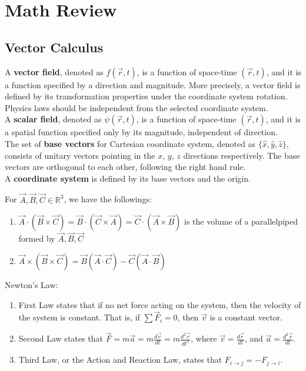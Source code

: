 \documentclass[11pt,oneside]{book}
\theoremstyle{break}
\theoremstyle{break}
\newcommand{\R}{\mathbb{R}}
\begin{document}
\tableofcontents
{}

\newpage
\chapter{Math Review}
\section[Vector Calculus]{\color{red} Vector Calculus\color{black}}
A \textbf{vector field}, denoted as $f(\vec{r},t)$, is a function of space-time $(\vec{r},t)$, and it is a function specified by a direction and magnitude. More precisely, a vector field is defined by its transformation properties under the coordinate system rotation. Physics laws should be independent from the selected coordinate system. \\

A \textbf{scalar field}, denoted as $\psi(\vec{r},t)$, is a function of space-time $(\vec{r},t)$, and it is a spatial function specified only by its magnitude, independent of direction.\\

The set of \textbf{base vectors} for Cartesian coordinate system, denoted as $\{\hat{x},\hat{y}, \hat{z}\}$, consists of unitary vectors pointing in the $x$, $y$, $z$ directions respectively. The base vectors are orthogonal to each other, following the right hand rule.\\

A \textbf{coordinate system} is defined by its base vectors and the origin. 

For $\vec{A},\vec{B},\vec{C} \in \R^3$, we have the followings:
\begin{enumerate}
\item $\vec{A}\cdot (\vec{B}\times \vec{C}) = \vec{B}\cdot (\vec{C}\times \vec{A}) = \vec{C}\cdot (\vec{A}\times \vec{B})$ is the volume of a parallelpiped formed by $\vec{A},\vec{B},\vec{C}$
\item $\vec{A}\times (\vec{B}\times \vec{C}) = \vec{B}(\vec{A}\cdot \vec{C}) - \vec{C}(\vec{A}\cdot \vec{B})$
\end{enumerate}

Newton's Law:
\begin{enumerate}
\item First Law states that if no net force acting on the system, then the velocity of the system is constant. That is, if $\sum \vec{F}_i = 0$, then $\vec{v}$ is a constant vector. 
\item Second Law states that $\vec{F} = m\vec{a} = m\frac{d\vec{v}}{dt} = m\frac{d^2\vec{r}}{dt^2}$, where $\vec{v} = \frac{d\vec{r}}{dt}$, and $\vec{a} = \frac{d^2\vec{r}}{dt}$.
\item Third Law, or the Action and Reaction Law, states that $F_{i\to j} = -F_{j \to i}$. 
\end{enumerate}
\end{document}
